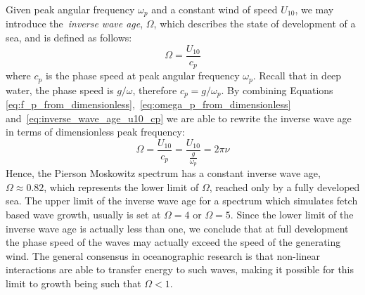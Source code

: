 Given peak angular frequency $\omega_p$ and a constant wind of speed $U_{10}$, 
we may introduce the~\emph{inverse wave age}, $\Omega$, which describes the 
state of development of a sea, and is defined as follows:
\begin{equation}
\label{eq:inverse_wave_age_u10_cp}
 \Omega = \frac{U_{10}}{c_p}
\end{equation}
where $c_p$ is the phase speed at peak angular frequency $\omega_p$. Recall that 
in deep water, the phase speed is $g/\omega$, therefore $c_p = g/\omega_p$. By 
combining Equations 
\ref{eq:f_p_from_dimensionless},~\ref{eq:omega_p_from_dimensionless} 
and~\ref{eq:inverse_wave_age_u10_cp} we are able to rewrite the inverse wave 
age in terms of dimensionless peak frequency:
\begin{equation}
 \Omega = \frac{U_{10}}{c_p} = \frac{U_{10}}{\frac{g}{\omega_p}} = 2\pi\nu
\end{equation}
Hence, the Pierson Moskowitz spectrum has a constant inverse wave age, $\Omega
\approx 0.82$, which represents the lower limit of $\Omega$, reached only by a 
fully developed sea. The upper limit of the inverse wave age for a spectrum 
which simulates fetch based wave growth, usually is set at $\Omega = 4$ or 
$\Omega = 5$. Since the lower limit of the inverse wave age is actually less 
than one, we conclude that at full development the phase speed of the waves may 
actually exceed the speed of the generating wind. The general consensus in 
oceanographic research is that non-linear interactions are able to transfer 
energy to such waves, making it possible for this limit to growth being such 
that $\Omega < 1$.
%
